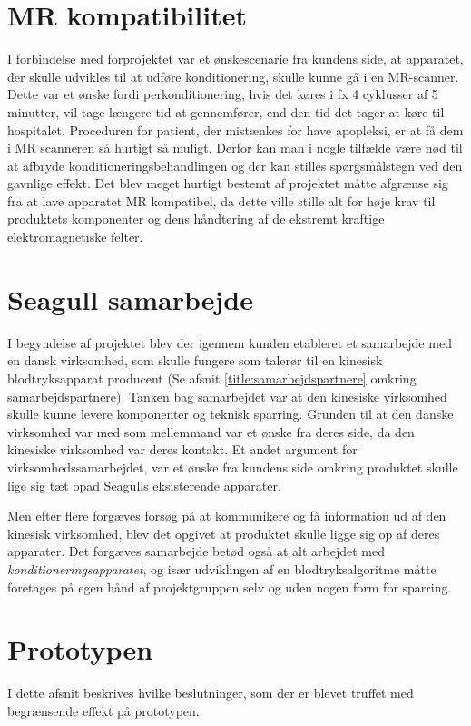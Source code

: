 \section{MR kompatibilitet}
I forbindelse med forprojektet var et ønskescenarie fra kundens side, at apparatet, der skulle udvikles til at udføre konditionering, skulle kunne gå i en MR-scanner. Dette var et ønske fordi perkonditionering, hvis det køres i fx 4 cyklusser af 5 minutter, vil tage længere tid at gennemfører, end den tid det tager at køre til hospitalet. Proceduren for patient, der mistænkes for have apopleksi, er at få dem i MR scanneren så hurtigt så muligt. Derfor kan man i nogle tilfælde være nød til at afbryde konditioneringsbehandlingen og der kan stilles spørgsmålstegn ved den gavnlige effekt. Det blev meget hurtigt bestemt af projektet måtte afgrænse sig fra at lave apparatet MR kompatibel, da dette ville stille alt for høje krav til produktets komponenter og dens håndtering af de ekstremt kraftige elektromagnetiske felter.

\section{Seagull samarbejde}
I begyndelse af projektet blev der igennem kunden etableret et samarbejde med en dansk virksomhed, som skulle fungere som talerør til en kinesisk blodtryksapparat producent (Se afsnit \ref{title:samarbejdspartnere} omkring samarbejdspartnere). Tanken bag samarbejdet var at den kinesiske virksomhed skulle kunne levere komponenter og teknisk sparring. Grunden til at den danske virksomhed var med som mellemmand var et ønske fra deres side, da den kinesiske virksomhed var deres kontakt. Et andet argument for virksomhedssamarbejdet, var et ønske fra kundens side omkring produktet skulle lige sig tæt opad Seagulls eksisterende apparater. 

Men efter flere forgæves forsøg på at kommunikere og få information ud af den kinesisk virksomhed, blev det opgivet at produktet skulle ligge sig op af deres apparater. Det forgæves samarbejde betød også at alt arbejdet med \textit{konditioneringsapparatet}, og især udviklingen af en blodtryksalgoritme måtte foretages på egen hånd af projektgruppen selv og uden nogen form for sparring. 

\section{Prototypen}
I dette afsnit beskrives hvilke beslutninger, som der er blevet truffet med begrænsende effekt på prototypen.

